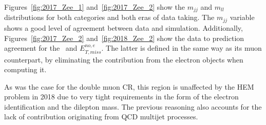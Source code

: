 \hspace{10pt} Figures~\ref{fig:2017_Zee_1} and~\ref{fig:2017_Zee_2} show the $m_{jj}$ and $m_{ll}$ distributions for both categories and both eras of data taking. The $m_{jj}$ variable shows a good level of agreement between data and simulation. Additionally, Figures~\ref{fig:2017_Zee_2} and~\ref{fig:2018_Zee_2} show the data to prediction agreement for the \mindphinoe~and $E_{T, miss}^{no, e}$. The latter is defined in the same way as its muon counterpart, by eliminating the contribution from the electron objects when computing it.

\hspace{10pt} As was the case for the double muon CR, this region is unaffected by the HEM problem in 2018 due to very tight requirements in the form of the electron identification and the dilepton mass. The previous reasoning also accounts for the lack of contribution originating from QCD multijet processes.

